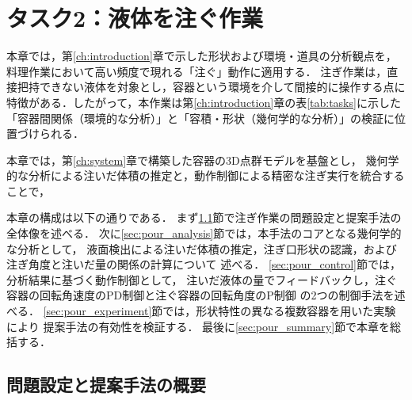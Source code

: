 \chapter{タスク2：液体を注ぐ作業}
\label{ch:pour}

本章では，第\ref{ch:introduction}章で示した形状および環境・道具の分析観点を，
料理作業において高い頻度で現れる「注ぐ」動作に適用する．
注ぎ作業は，直接把持できない液体を対象とし，容器という環境を介して間接的に操作する点に
特徴がある．したがって，本作業は第\ref{ch:introduction}章の表\ref{tab:tasks}に示した
「容器間関係（環境的な分析）」と「容積・形状（幾何学的な分析）」の検証に位置づけられる．

本章では，第\ref{ch:system}章で構築した容器の3D点群モデルを基盤とし，
幾何学的な分析による注いだ体積の推定と，動作制御による精密な注ぎ実行を統合することで，

本章の構成は以下の通りである．
まず\ref{sec:pour_problem_overview}節で注ぎ作業の問題設定と提案手法の全体像を述べる．
次に\ref{sec:pour_analysis}節では，本手法のコアとなる幾何学的な分析として，
液面検出による注いだ体積の推定，注ぎ口形状の認識，および注ぎ角度と注いだ量の関係の計算について
述べる．
\ref{sec:pour_control}節では，分析結果に基づく動作制御として，
注いだ液体の量でフィードバックし，注ぐ容器の回転角速度のPD制御と注ぐ容器の回転角度のP制御
の2つの制御手法を述べる．
\ref{sec:pour_experiment}節では，形状特性の異なる複数容器を用いた実験により
提案手法の有効性を検証する．
最後に\ref{sec:pour_summary}節で本章を総括する．


\section{問題設定と提案手法の概要}
\label{sec:pour_problem_overview}

